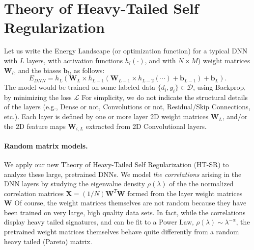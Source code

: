 
\section{Theory of Heavy-Tailed Self Regularization}
\label{sxn:theory}


Let us write the Energy Landscape (or optimization function) for a typical DNN with $L$ layers, with activation functions $h_{l}(\cdot)$, and with $N\times M$)  weight matrices $\mathbf{W}_{l}$, and the biases $\mathbf{b}_{l}$, as follows:
\begin{equation}
E_{DNN}=h_{L}(\mathbf{W}_{L}\times h_{L-1}(\mathbf{W}_{L-1}\times h_{L-2}(\cdots)+\mathbf{b}_{L-1})+\mathbf{b}_{L})  .
\label{eqn:dnn_energy}
\end{equation}
The model would be trained on some labeled data $\{d_{i},y_{i}\}\in\mathcal{D}$, using Backprop, by minimizing the loss $\mathcal{L}$
For simplicity, we do not indicate the structural details of the layers (e.g., Dense or not, Convolutions or not, Residual/Skip Connections, etc.). 
Each layer is defined by one or more layer 2D weight matrices $\mathbf{W}_{L}$, and/or the 2D feature maps $\mathbf{W}_{i,L}$ 
extracted from 2D Convolutional layers.



\paragraph{Random matrix models.} 

We apply our new Theory of Heavy-Tailed Self Regularization (HT-SR) to analyze these large, pretrained DNNs.  
We model \emph{the correlations} arising in the DNN layers by studying the eigenvalue density   $\rho(\lambda)$ of the
the normalized correlation matrices $\mathbf{X}=(1/N)\mathbf{W}^{T}\mathbf{W}$ formed from the layer weight matrices $\mathbf{W}$ 
Of course, the weight matrices themselves are not  random because they have been trained on very large, high quality data sets.
In fact, while the correlations display heavy tailed signatures, and can be fit to a Power Law, $\rho(\lambda)\sim\lambda^{-\alpha}$,
 the pretrained weight matrices themselves behave quite differently from a random heavy tailed (Pareto) matrix.

